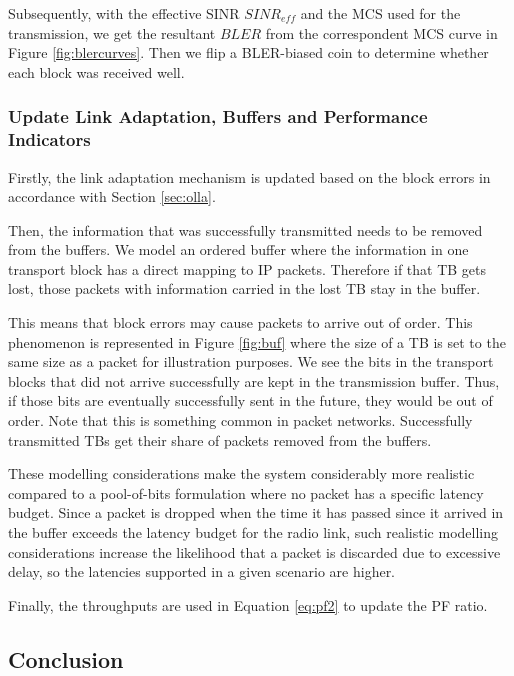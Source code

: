 Subsequently, with the effective SINR $SINR_{eff}$ and the MCS used for the transmission, we get the resultant $BLER$ from the correspondent MCS curve in Figure \ref{fig:blercurves}. Then we flip a \acs{BLER}-biased coin to determine whether each block was received well.


\subsubsection*{Update Link Adaptation, Buffers and Performance Indicators}

Firstly, the link adaptation mechanism is updated based on the block errors in accordance with Section \ref{sec:olla}. 

Then, the information that was successfully transmitted needs to be removed from the buffers. We model an ordered buffer where the information in one transport block has a direct mapping to IP packets. Therefore if that TB gets lost, those packets with information carried in the lost TB stay in the buffer.

This means that block errors may cause packets to arrive out of order. This phenomenon is represented in Figure \ref{fig:buf} where the size of a TB is set to the same size as a packet for illustration purposes. We see the bits in the transport blocks that did not arrive successfully are kept in the transmission buffer. Thus, if those bits are eventually successfully sent in the future, they would be out of order. Note that this is something common in packet networks. Successfully transmitted TBs get their share of packets removed from the buffers.



These modelling considerations make the system considerably more realistic compared to a pool-of-bits formulation where no packet has a specific latency budget. Since a packet is dropped when the time it has passed since it arrived in the buffer exceeds the latency budget for the radio link, such realistic modelling considerations increase the likelihood that a packet is discarded due to excessive delay, so the latencies supported in a given scenario are higher.

Finally, the throughputs are used in Equation \eqref{eq:pf2} to update the PF ratio.

\subsection*{Conclusion}

